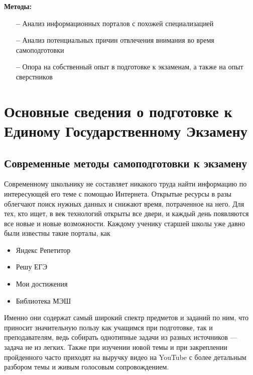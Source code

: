 \documentclass[a4paper, 12pt]{extarticle}
\begin{document}
\vspace{2mm}
\textbf{Методы:}
\begin{itemize}
    \item[\bfseries--] Анализ информационных порталов с похожей специализацией
    \item[\bfseries--] Анализ потенциальных причин отвлечения внимания во время
        самоподготовки
    \item[\bfseries--] Опора на собственный опыт в подготовке к экзаменам, а
        также на опыт сверстников
\end{itemize}
\newpage

\section{Основные сведения о подготовке к Единому Государственному Экзамену}
\subsection{Современные методы самоподготовки к экзамену}
\vspace{2mm}
Современному школьнику не составляет никакого труда найти информацию по
интересующей его теме с помощью Интернета. Открытые ресурсы в разы облегчают
поиск нужных данных и снижают время, потраченное на него. Для тех, кто ищет, в век
технологий открыты все двери, и каждый день появляются все новые и новые
возможности. Каждому ученику старшей школы уже давно были известны такие
порталы, как
\begin{itemize}
    \item {\small Яндекс Репетитор\par}
    \item {\small Решу ЕГЭ\par}
    \item {\small Мои достижения\par}
    \item {\small Библиотека МЭШ\par}
\end{itemize}
Именно они содержат самый широкий спектр предметов и заданий по ним, что
приносит значительную пользу как учащимся при подготовке, так и преподавателям, ведь собирать
однотипные задачи из разных источников — задача не из легких. Также при изучении
новой темы и при закреплении пройденного часто приходят на выручку видео на
YouTube с более детальным разбором темы и живым голосовым сопровождением.
\\
\end{document}
